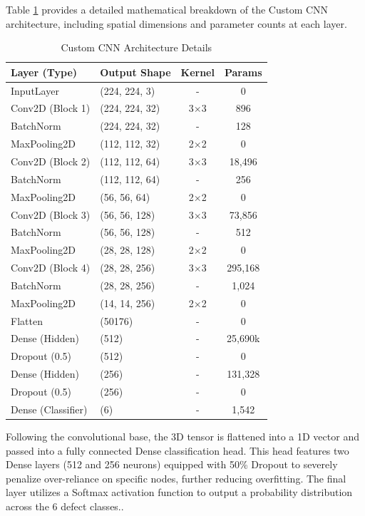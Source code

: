 \documentclass[conference, a4paper]{IEEEtran}
\begin{document}
Table \ref{tab:architecture} provides a detailed mathematical breakdown of the Custom CNN architecture, including spatial dimensions and parameter counts at each layer.

\begin{table}[htbp]
\caption{Custom CNN Architecture Details}
\begin{center}
\begin{tabular}{llcc}
\toprule
\textbf{Layer (Type)} & \textbf{Output Shape} & \textbf{Kernel} & \textbf{Params} \\
\midrule
InputLayer & (224, 224, 3) & - & 0 \\
Conv2D (Block 1) & (224, 224, 32) & 3$\times$3 & 896 \\
BatchNorm & (224, 224, 32) & - & 128 \\
MaxPooling2D & (112, 112, 32) & 2$\times$2 & 0 \\
Conv2D (Block 2) & (112, 112, 64) & 3$\times$3 & 18,496 \\
BatchNorm & (112, 112, 64) & - & 256 \\
MaxPooling2D & (56, 56, 64) & 2$\times$2 & 0 \\
Conv2D (Block 3) & (56, 56, 128) & 3$\times$3 & 73,856 \\
BatchNorm & (56, 56, 128) & - & 512 \\
MaxPooling2D & (28, 28, 128) & 2$\times$2 & 0 \\
Conv2D (Block 4) & (28, 28, 256) & 3$\times$3 & 295,168 \\
BatchNorm & (28, 28, 256) & - & 1,024 \\
MaxPooling2D & (14, 14, 256) & 2$\times$2 & 0 \\
Flatten & (50176) & - & 0 \\
Dense (Hidden)& (512) & - & 25,690k \\
Dropout (0.5) & (512) & - & 0 \\
Dense (Hidden)& (256) & - & 131,328 \\
Dropout (0.5) & (256) & - & 0 \\
Dense (Classifier) & (6) & - & 1,542 \\
\bottomrule
\end{tabular}
\label{tab:architecture}
\end{center}
\end{table}

Following the convolutional base, the 3D tensor is flattened into a 1D vector and passed into a fully connected Dense classification head. This head features two Dense layers (512 and 256 neurons) equipped with 50\% Dropout to severely penalize over-reliance on specific nodes, further reducing overfitting. The final layer utilizes a Softmax activation function to output a probability distribution across the 6 defect classes..
\end{document}
